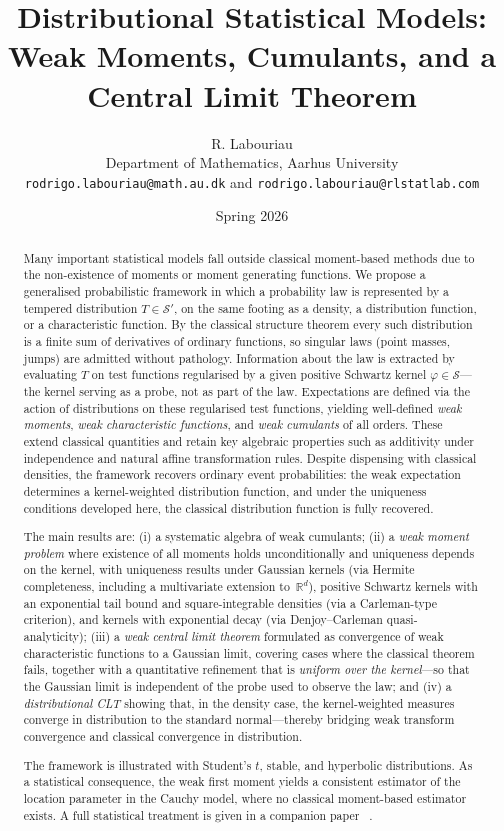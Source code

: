 \documentclass[12pt]{article}
\title{Distributional Statistical Models:\\ \large
Weak Moments, Cumulants, and a Central Limit Theorem}
\author{
R. Labouriau\\[0.3em]
\small Department of Mathematics, Aarhus University\\
\small \texttt{rodrigo.labouriau@math.au.dk} and
\small \texttt{rodrigo.labouriau@rlstatlab.com}
}
\date{Spring 2026}
\theoremstyle{definition}
\newcommand{\Fseven} {\fontsize{7}{11}\selectfont  }
\begin{document}
\maketitle
{}
\begin{abstract} \Fseven
Many important statistical models fall outside classical moment-based methods due to the non-existence of moments or moment generating functions. We propose a generalised probabilistic framework in which a probability law is represented by a tempered distribution $T \in \mathcal{S}'$, on the same footing as a density, a distribution function, or a characteristic function. By the classical structure theorem every such distribution is a finite sum of derivatives of ordinary functions, so singular laws (point masses, jumps) are admitted without pathology. Information about the law is extracted by evaluating $T$ on test functions regularised by a given positive Schwartz kernel $\varphi \in \mathcal{S}$---the kernel serving as a probe, not as part of the law. Expectations are defined via the action of distributions on these regularised test functions, yielding well-defined \emph{weak moments}, \emph{weak characteristic functions}, and \emph{weak cumulants} of all orders. These extend classical quantities and retain key algebraic properties such as additivity under independence and natural affine transformation rules.  Despite dispensing with classical densities, the framework recovers ordinary event probabilities: the weak expectation determines a kernel-weighted distribution function, and under the uniqueness conditions developed here, the classical distribution function is fully recovered.

The main results are: (i) a systematic algebra of weak cumulants; (ii) a \emph{weak moment problem} where existence of all moments holds unconditionally and uniqueness depends on the kernel, with uniqueness results under Gaussian kernels (via Hermite completeness, including a multivariate extension to~$\mathbb{R}^d$), positive Schwartz kernels with an exponential tail bound and square-integrable densities (via a Carleman-type criterion), and kernels with exponential decay (via Denjoy--Carleman quasi-analyticity); (iii) a \emph{weak central limit theorem} formulated as convergence of weak characteristic functions to a Gaussian limit, covering cases where the classical theorem fails, together with a quantitative refinement that is \emph{uniform over the kernel}---so that the Gaussian limit is independent of the probe used to observe the law; and (iv) a \emph{distributional CLT} showing that, in the density case, the kernel-weighted measures converge in distribution to the standard normal---thereby bridging weak transform convergence and classical convergence in distribution.

The framework is illustrated with Student's $t$, stable, and hyperbolic distributions. As a statistical consequence, the weak first moment yields a consistent estimator of the location parameter in the Cauchy model, where no classical moment-based estimator exists. A full statistical treatment is given in a companion paper ~\cite{LabouriauA2}.
\end{abstract}
\end{document}
